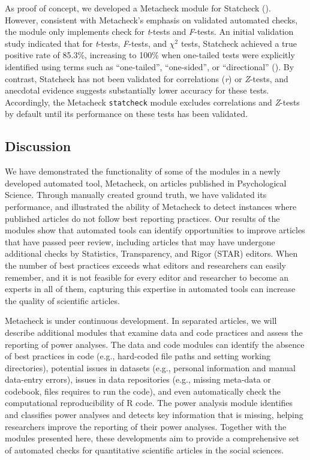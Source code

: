 \documentclass[
  letterpaper,
  12pt]{article}
\begin{document}
As proof of concept, we developed a Metacheck module for Statcheck
(). However, consistent
with Metacheck's emphasis on validated automated checks, the module only
implements check for \emph{t}-tests and \emph{F}-tests. An initial
validation study indicated that for \emph{t}-tests, \emph{F}-tests, and
\(\chi^2\) tests, Statcheck achieved a true positive rate of 85.3\%,
increasing to 100\% when one-tailed tests were explicitly identified
using terms such as ``one-tailed'', ``one-sided'', or ``directional''
(). By
contrast, Statcheck has not been validated for correlations (\emph{r})
or \emph{Z}-tests, and anecdotal evidence suggests substantially lower
accuracy for these tests. Accordingly, the Metacheck \texttt{statcheck}
module excludes correlations and \emph{Z}-tests by default until its
performance on these tests has been validated.

\subsection{Discussion}\label{discussion}

We have demonstrated the functionality of some of the modules in a newly
developed automated tool, Metacheck, on articles published in
Psychological Science. Through manually created ground truth, we have
validated its performance, and illustrated the ability of Metacheck to
detect instances where published articles do not follow best reporting
practices. Our results of the modules show that automated tools can
identify opportunities to improve articles that have passed peer review,
including articles that may have undergone additional checks by
Statistics, Transparency, and Rigor (STAR) editors. When the number of
best practices exceeds what editors and researchers can easily remember,
and it is not feasible for every editor and researcher to become an
experts in all of them, capturing this expertise in automated tools can
increase the quality of scientific articles.

Metacheck is under continuous development. In separated articles, we
will describe additional modules that examine data and code practices
and assess the reporting of power analyses. The data and code modules
can identify the absence of best practices in code (e.g., hard-coded
file paths and setting working directories), potential issues in
datasets (e.g., personal information and manual data-entry errors),
issues in data repositories (e.g., missing meta-data or codebook, files
requires to run the code), and even automatically check the
computational reproducibility of R code. The power analysis module
identifies and classifies power analyses and detects key information
that is missing, helping researchers improve the reporting of their
power analyses. Together with the modules presented here, these
developments aim to provide a comprehensive set of automated checks for
quantitative scientific articles in the social sciences.
\end{document}
